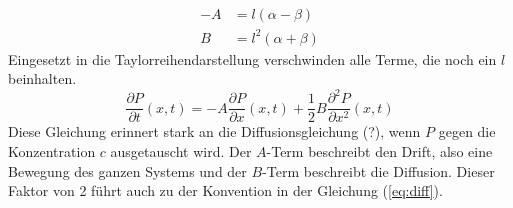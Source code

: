 \begin{align}
  - A & = l (\alpha - \beta) \\
  B & = l^2 (\alpha + \beta)
\end{align}
Eingesetzt in die Taylorreihendarstellung verschwinden alle Terme, die noch ein $l$ beinhalten.
\begin{equation}
  \frac{\partial P}{\partial t} (x, t) = - A \frac{\partial P}{\partial x}(x, t) + \frac{1}{2} B \frac{\partial^2 P}{\partial x^2} (x, t)
\end{equation}
Diese Gleichung erinnert stark an die Diffusionsgleichung (?), wenn $P$ gegen die Konzentration $c$ ausgetauscht wird. Der $A$-Term beschreibt den Drift, also eine Bewegung des ganzen Systems und der $B$-Term beschreibt die Diffusion. Dieser Faktor von 2 führt auch zu der Konvention in der Gleichung (\ref{eq:diff}).
